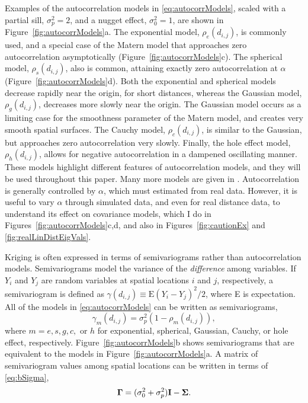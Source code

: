 \documentclass[11pt, titlepage]{article}\usepackage[]{graphicx}\usepackage[]{color}
\begin{document}
\begin{spacing}{1.9}
\begin{flushleft}
Examples of the autocorrelation models in \ref{eq:autocorrModels}, scaled with a partial sill, $\sigma^2_p = 2$, and a nugget effect, $\sigma^2_0 = 1$, are shown in Figure~\ref{fig:autocorrModels}a.  The exponential model, $\rho_e(d_{i,j})$, is commonly used, and a special case of the Matern model that approaches zero autocorrelation asymptotically (Figure~\ref{fig:autocorrModels}c). The spherical model, $\rho_s(d_{i,j})$, also is common, attaining exactly zero autocorrelation at $\alpha$ (Figure~\ref{fig:autocorrModels}d).  Both the exponential and spherical models decrease rapidly near the origin, for short distances, whereas the Gaussian model, $\rho_g(d_{i,j})$, decreases more slowly near the origin. The Gaussian model occurs as a limiting case for the smoothness parameter of the Matern model, and creates very smooth spatial surfaces. The Cauchy model, $\rho_c(d_{i,j})$, is similar to the Gaussian, but approaches zero autocorrelation very slowly. Finally, the hole effect model, $\rho_h(d_{i,j})$, allows for negative autocorrelation in a dampened oscillating manner. These models highlight different features of autocorrelation models, and they will be used throughout this paper. Many more models are given in \citet[][p. 80--93]{Chil:Delf:geos:1999}.  Autocorrelation is generally controlled by $\alpha$, which must estimated from real data.  However, it is useful to vary $\alpha$ through simulated data, and even for real distance data, to understand its effect on covariance models, which I do in Figures~\ref{fig:autocorrModels}c,d, and also in Figures~\ref{fig:cautionEx} and \ref{fig:realLinDistEigVals}.

Kriging is often expressed in terms of semivariograms rather than autocorrelation models.  Semivariograms model the variance of the \emph{difference} among variables. If $Y_i$ and $Y_j$ are random variables at spatial locations $i$ and $j$, respectively, a semivariogram is defined as $\gamma(d_{i,j}) \equiv \textrm{E}(Y_i - Y_j)^2/2$, where E is expectation.  All of the models in \ref{eq:autocorrModels} can be written as semivariograms,
\begin{equation} \label{eq:semivarrho}
				\gamma_m(d_{i,j}) = \sigma^2_p(1 - \rho_m(d_{i,j})),
\end{equation}
where $m = e, s, g, c,$ or $h$ for exponential, spherical, Gaussian, Cauchy, or hole effect, respectively. Figure~\ref{fig:autocorrModels}b shows semivariograms that are equivalent to the models in Figure~\ref{fig:autocorrModels}a.  A matrix of semivariogram values among spatial locations can be written in terms of \ref{eq:bSigma},
\[
\mbox{\boldmath $\Gamma$} = (\sigma_0^2 + \sigma^2_p)\mathbf{I} - \mbox{\boldmath $\Sigma$}.
\]


\end{flushleft}
\end{spacing}
\end{document}
